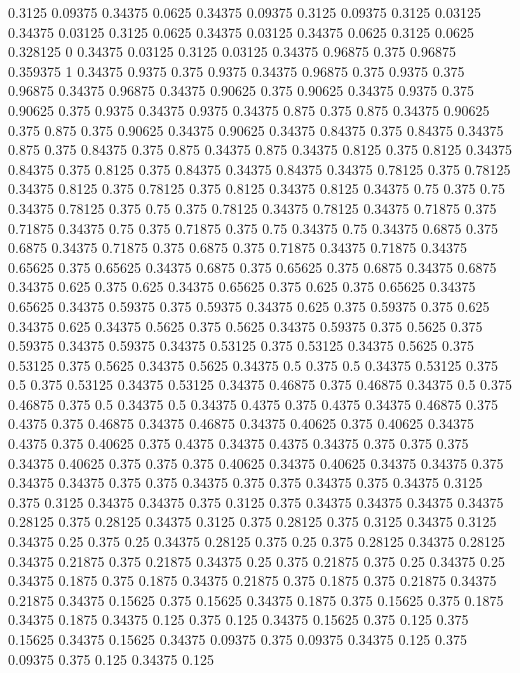 0.3125 0.09375
0.34375 0.0625
0.34375 0.09375
0.3125 0.09375
0.3125 0.03125
0.34375 0.03125
0.3125 0.0625
0.34375 0.03125
0.34375 0.0625
0.3125 0.0625
0.328125 0
0.34375 0.03125
0.3125 0.03125
0.34375 0.96875
0.375 0.96875
0.359375 1
0.34375 0.9375
0.375 0.9375
0.34375 0.96875
0.375 0.9375
0.375 0.96875
0.34375 0.96875
0.34375 0.90625
0.375 0.90625
0.34375 0.9375
0.375 0.90625
0.375 0.9375
0.34375 0.9375
0.34375 0.875
0.375 0.875
0.34375 0.90625
0.375 0.875
0.375 0.90625
0.34375 0.90625
0.34375 0.84375
0.375 0.84375
0.34375 0.875
0.375 0.84375
0.375 0.875
0.34375 0.875
0.34375 0.8125
0.375 0.8125
0.34375 0.84375
0.375 0.8125
0.375 0.84375
0.34375 0.84375
0.34375 0.78125
0.375 0.78125
0.34375 0.8125
0.375 0.78125
0.375 0.8125
0.34375 0.8125
0.34375 0.75
0.375 0.75
0.34375 0.78125
0.375 0.75
0.375 0.78125
0.34375 0.78125
0.34375 0.71875
0.375 0.71875
0.34375 0.75
0.375 0.71875
0.375 0.75
0.34375 0.75
0.34375 0.6875
0.375 0.6875
0.34375 0.71875
0.375 0.6875
0.375 0.71875
0.34375 0.71875
0.34375 0.65625
0.375 0.65625
0.34375 0.6875
0.375 0.65625
0.375 0.6875
0.34375 0.6875
0.34375 0.625
0.375 0.625
0.34375 0.65625
0.375 0.625
0.375 0.65625
0.34375 0.65625
0.34375 0.59375
0.375 0.59375
0.34375 0.625
0.375 0.59375
0.375 0.625
0.34375 0.625
0.34375 0.5625
0.375 0.5625
0.34375 0.59375
0.375 0.5625
0.375 0.59375
0.34375 0.59375
0.34375 0.53125
0.375 0.53125
0.34375 0.5625
0.375 0.53125
0.375 0.5625
0.34375 0.5625
0.34375 0.5
0.375 0.5
0.34375 0.53125
0.375 0.5
0.375 0.53125
0.34375 0.53125
0.34375 0.46875
0.375 0.46875
0.34375 0.5
0.375 0.46875
0.375 0.5
0.34375 0.5
0.34375 0.4375
0.375 0.4375
0.34375 0.46875
0.375 0.4375
0.375 0.46875
0.34375 0.46875
0.34375 0.40625
0.375 0.40625
0.34375 0.4375
0.375 0.40625
0.375 0.4375
0.34375 0.4375
0.34375 0.375
0.375 0.375
0.34375 0.40625
0.375 0.375
0.375 0.40625
0.34375 0.40625
0.34375 0.34375
0.375 0.34375
0.34375 0.375
0.375 0.34375
0.375 0.375
0.34375 0.375
0.34375 0.3125
0.375 0.3125
0.34375 0.34375
0.375 0.3125
0.375 0.34375
0.34375 0.34375
0.34375 0.28125
0.375 0.28125
0.34375 0.3125
0.375 0.28125
0.375 0.3125
0.34375 0.3125
0.34375 0.25
0.375 0.25
0.34375 0.28125
0.375 0.25
0.375 0.28125
0.34375 0.28125
0.34375 0.21875
0.375 0.21875
0.34375 0.25
0.375 0.21875
0.375 0.25
0.34375 0.25
0.34375 0.1875
0.375 0.1875
0.34375 0.21875
0.375 0.1875
0.375 0.21875
0.34375 0.21875
0.34375 0.15625
0.375 0.15625
0.34375 0.1875
0.375 0.15625
0.375 0.1875
0.34375 0.1875
0.34375 0.125
0.375 0.125
0.34375 0.15625
0.375 0.125
0.375 0.15625
0.34375 0.15625
0.34375 0.09375
0.375 0.09375
0.34375 0.125
0.375 0.09375
0.375 0.125
0.34375 0.125
